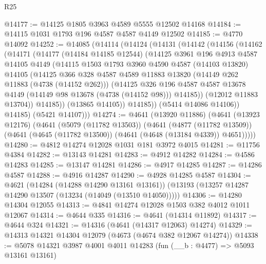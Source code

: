 \begin{lexlean}{R25}
\begin{coremodule}
@14177 := @14125 @1805 @3963 @4589 @5555 @12502 @14168
@14184 := @14115 @1031 @1793 @196 @4587 @4587 @4149 @12502
@14185 := @4770 @14092
@14252 := @14085
    (@14114
      (@14124
        (@14131
          (@14142
            (@14156
              (@14162
                (@14171
                  (@14177
                    (@14184 @14185 @12544)
                    (@14125
                      @3961
                      @196
                      @4913
                      @4587
                      @14105
                      @4149
                      (@14115
                        @1503
                        @1793
                        @3960
                        @4590
                        @4587
                        (@14103 @13820)
                        @14105
                        (@14125
                          @366
                          @328
                          @4587
                          @4589
                          @11883
                          @13820
                          (@14149 @262 @11883 (@4738 (@14152 @262)))
                          (@14125
                            @326
                            @196
                            @4587
                            @4587
                            @13678
                            @4149
                            (@14149 @98 @13678 (@4738 (@14152 @98)))
                            @14185))
                        (@12012 @11883 @13704))
                      @14185))
                  (@13865 @14105))
                @14185))
            (@5414 @14086 @14106))
          @14185)
        (@5421 @14107)))
@14274 := @4641
    (@13920 @11886)
    (@4641
      (@13923 @12176)
      (@4641
        (@5079 (@11782 @13503))
        (@4641
          (@4877 (@11782 @13509))
          (@4641 (@4645 (@11782 @13500)) (@4641 (@4648 (@13184 @4339)) @4651)))))
@14280 := @4812 @14274 @12028 @1031 @181 @3972 @4015
@14281 := @11756 @4384
@14282 := @13143 @14281
@14283 := @4912 @14282
@14284 := @4586 @14283
@14285 := @13147 @14281
@14286 := @4917 @14285
@14287 := @14286 @4587
@14288 := @4916 @14287
@14290 := @4928 @14285 @4587
@14304 := @4621
    (@14284 (@14288 @14290 @13161 @13161))
    (@13193 (@13257 @14287 @14290 @13507 (@13234 (@14049 (@13510 @14050)))))
@14306 := @14280 @14304 @12055
@14313 := @4841 @14274 @12028 @1503 @382 @4012 @1011 @12067
@14314 := @4644 @335
@14316 := @4641 (@14314 @11892)
@14317 := @4644 @324
@14321 := @14316 (@4641 (@14317 @12063) @14274)
@14329 := @14313 @14321 @14304 @12079 (@4673 (@4674 @382 @12067 @14274))
@14338 := @5078 @14321 @3987 @4001 @4011 @14283 (fun (__b : @4477) => @5093 @13161 @13161)

\end{coremodule}
\end{lexlean}
